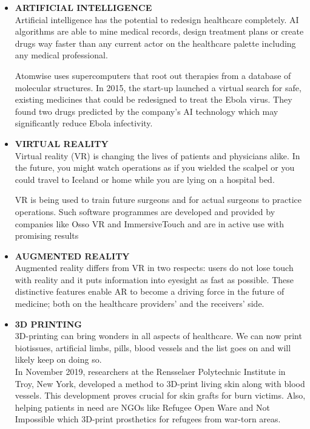 \documentclass[12pt]{article}
\begin{document}
\begin{itemize}

\item \textbf{ARTIFICIAL INTELLIGENCE}\\
 Artificial intelligence has the potential to redesign healthcare completely. AI algorithms are able to mine medical records, design treatment plans or create drugs way faster than any current actor on the healthcare palette including any medical professional. 

Atomwise uses supercomputers that root out therapies from a database of molecular structures. In 2015, the start-up launched a virtual search for safe, existing medicines that could be redesigned to treat the Ebola virus. They found two drugs predicted by the company’s AI technology which may significantly reduce Ebola infectivity.



\item\textbf{VIRTUAL REALITY}\\
Virtual reality (VR) is changing the lives of patients and physicians alike. In the future, you might watch operations as if you wielded the scalpel or you could travel to Iceland or home while you are lying on a hospital bed. 

VR is being used to train future surgeons and for actual surgeons to practice operations. Such software programmes are developed and provided by companies like Osso VR and ImmersiveTouch and are in active use with promising results

\item\textbf{AUGMENTED REALITY}\\
Augmented reality differs from VR in two respects: users do not lose touch with reality and it puts information into eyesight as fast as possible. These distinctive features enable AR to become a driving force in the future of medicine; both on the healthcare providers’ and the receivers’ side.



\item\textbf{3D PRINTING}\\
3D-printing can bring wonders in all aspects of healthcare. We can now print biotissues, artificial limbs, pills, blood vessels and the list goes on and will likely keep on doing so.\\

In November 2019, researchers at the Rensselaer Polytechnic Institute in Troy, New York, developed a method to 3D-print living skin along with blood vessels. This development proves crucial for skin grafts for burn victims. Also, helping patients in need are NGOs like Refugee Open Ware and Not Impossible which 3D-print prosthetics for refugees from war-torn areas. 






\end{itemize}
\end{document}
